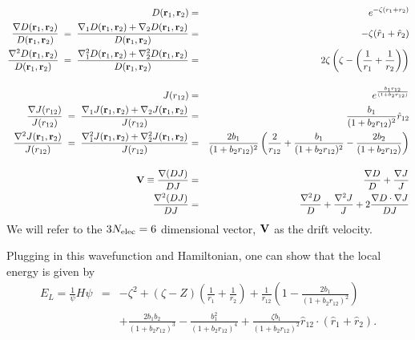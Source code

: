 \documentclass[11pt,aps,prb,amsmath,amssymb,superscriptaddress,notitlepage]{revtex4-1}
\def\beq{\begin{eqnarray}}
\def\eeq{\end{eqnarray}}
\def\rvec{{\bf r}}
\def\Vvec{{\bf V}}
\def\rhat{\hat{r}}
\begin{document}
\beq
D(\rvec_1,\rvec_2) &=& e^{-\zeta(r_1+r_2)} \\
{\nabla D(\rvec_1,\rvec_2) \over D(\rvec_1,\rvec_2)} \;=\; {\nabla_1 D(\rvec_1,\rvec_2) + \nabla_2 D(\rvec_1,\rvec_2) \over D(\rvec_1,\rvec_2)}
&=& -\zeta (\rhat_1+\rhat_2) \\
{\nabla^2 D(\rvec_1,\rvec_2) \over D(\rvec_1,\rvec_2)} \;=\; {\nabla^2_1 D(\rvec_1,\rvec_2) + \nabla^2_2 D(\rvec_1,\rvec_2) \over D(\rvec_1,\rvec_2)}
&=& 2\zeta\left(\zeta -\left({1 \over r_1}+{1 \over r_2}\right)\right) \\[4mm]
J(r_{12}) &=& e^{b_1 r_{12} \over (1+b_2 r_{12})} \\
{\nabla J(r_{12}) \over J(r_{12})} \;=\; {\nabla_1 J(\rvec_1,\rvec_2) + \nabla_2 J(\rvec_1,\rvec_2) \over J(r_{12})}
&=& {b_1 \over (1+b_2 r_{12})^2} \rhat_{12} \\
{\nabla^2 J(\rvec_1,\rvec_2) \over J(r_{12})} \;=\; {\nabla^2_1 J(\rvec_1,\rvec_2) + \nabla^2_2 J(\rvec_1,\rvec_2) \over J(r_{12})}
&=& {2 b_1 \over (1+b_2 r_{12})^2} \left({2 \over r_{12}} + {b_1 \over (1+b_2 r_{12})^2} - {2 b_2 \over (1+b_2 r_{12})} \right) \\[4mm]
\label{drift}
\Vvec \equiv {{\bf\nabla} (D J) \over D J} &=& {{\bf \nabla} D \over D} + {{\bf \nabla} J \over J} \\
{\nabla^2 (D J) \over D J} &=& {\nabla^2 D \over D} + {\nabla^2 J \over J}
+ 2 {{\bf\nabla} D \cdot {\bf \nabla} J \over D J}
\eeq
We will refer to the $3N_{\rm elec} = 6$ dimensional vector, $\Vvec$ as the drift velocity.

Plugging in this wavefunction and Hamiltonian, one can show that the
local energy is given by
\beq
E_{L}=\frac{1}{\psi}H\psi & = & -\zeta ^{2}+\left(\zeta -Z\right)\left(\frac{1}{r_{1}}+\frac{1}{r_{2}}\right)+\frac{1}{r_{12}}\left(1-\frac{2b_1}{\left(1+b_2 r_{12}\right)^{2}}\right) \nonumber \\
 &  & +\frac{2b_1 b_2}{\left(1+b_2 r_{12}\right)^{3}}-\frac{b_1^{2}}{\left(1+b_2 r_{12}\right)^{4}}+\frac{\zeta b_1}{\left(1+b_2 r_{12}\right)^{2}}\hat{r}_{12}\cdot\left(\hat{r}_{1}+\hat{r}_{2}\right).
\label{E_local}
\eeq
\end{document}
